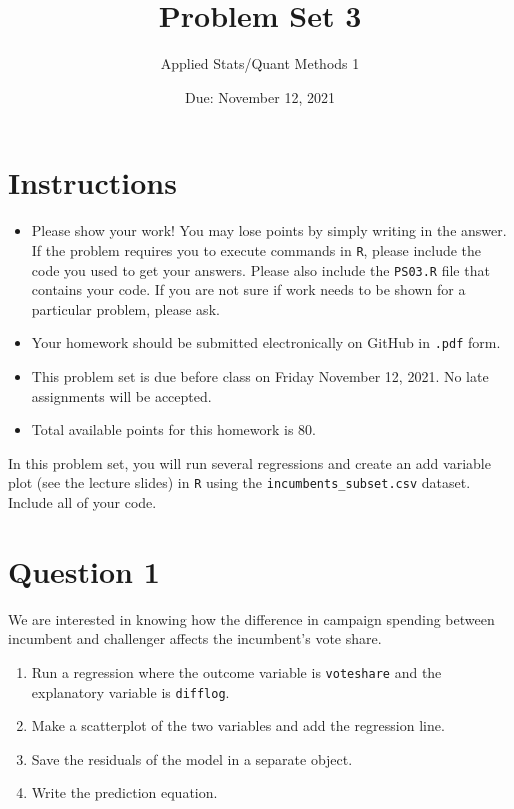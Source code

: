 \documentclass[12pt,letterpaper]{article}
\title{Problem Set 3}
\date{Due: November 12, 2021}
\author{Applied Stats/Quant Methods 1}
\begin{document}
	\maketitle
	\section*{Instructions}
	\begin{itemize}
		\item Please show your work! You may lose points by simply writing in the answer. If the problem requires you to execute commands in \texttt{R}, please include the code you used to get your answers. Please also include the \texttt{PS03.R} file that contains your code. If you are not sure if work needs to be shown for a particular problem, please ask.
		\item Your homework should be submitted electronically on GitHub in \texttt{.pdf} form.
		\item This problem set is due before class on Friday November 12, 2021. No late assignments will be accepted.
		\item Total available points for this homework is 80.
	\end{itemize}
	
	
	\vspace{.25cm}
	
	\noindent In this problem set, you will run several regressions and create an add variable plot (see the lecture slides) in \texttt{R} using the \texttt{incumbents\_subset.csv} dataset. Include all of your code.
	
	\vspace{.5cm}
	\section*{Question 1} %
\vspace{.25cm}
\noindent We are interested in knowing how the difference in campaign spending between incumbent and challenger affects the incumbent's vote share. 
\begin{enumerate}
	\item Run a regression where the outcome variable is \texttt{voteshare} and the explanatory variable is \texttt{difflog}.	\vspace{5cm}
	
	\item Make a scatterplot of the two variables and add the regression line. 	\vspace{7cm}
	\item Save the residuals of the model in a separate object.	\vspace{7cm}
	\item Write the prediction equation.
\end{enumerate}
\end{document}
